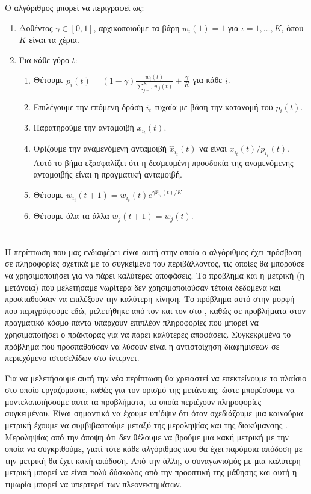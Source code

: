 Ο αλγόριθμος μπορεί να περιγραφεί ως:
\begin{enumerate}
    \item Δοθέντος $γ \in [0,1]$, αρχικοποιούμε τα βάρη $w_i(1)=1$ για $ι = 1,\ldots,K$, όπου $K$ είναι τα χέρια.
    \item Για κάθε γύρο $t$:
          \begin{enumerate}
              \item Θέτουμε $p_i(t) = (1-γ)\frac{w_i(t)}{\sum_{j=1}^K w_j(t)} + \frac{γ}{K}$ για κάθε $i$.
              \item Επιλέγουμε την επόμενη δράση $i_t$ τυχαία με βάση την κατανομή του $p_i(t)$.
              \item Παρατηρούμε την ανταμοιβή $x_{i_t}(t)$.
              \item Ορίζουμε την αναμενόμενη ανταμοιβή $\hat{x}_{i_t}(t)$ να είναι $x_{i_t}(t)/p_{i_t}(t)$. Αυτό το βήμα εξασφαλίζει ότι η δεσμευμένη προσδοκία της αναμενόμενης ανταμοιβής είναι η πραγματική ανταμοιβή.
              \item Θέτουμε $w_{i_t}(t+1) = w_{i_t}(t)e^{γ\hat{x}_{i_t}(t)/K}$
              \item Θέτουμε όλα τα άλλα $w_j(t+1) = w_j(t)$.
          \end{enumerate}
\end{enumerate}

\section{}
Η περίπτωση  που μας ενδιαφέρει είναι αυτή στην οποία ο αλγόριθμος έχει πρόσβαση σε πληροφορίες σχετικά με το συγκείμενο του περιβάλλοντος, τις οποίες θα μπορούσε να χρησιμοποιήσει για να πάρει καλύτερες αποφάσεις. Το πρόβλημα και η μετρική (η μετάνοια) που μελετήσαμε νωρίτερα δεν χρησιμοποιούσαν τέτοια δεδομένα και προσπαθούσαν να επιλέξουν την καλύτερη κίνηση. Το πρόβλημα αυτό στην μορφή που περιγράφουμε εδώ, μελετήθηκε από τον   και τον  στο \cite{langford_epoch-greedy_2007}, καθώς σε προβλήματα στον πραγματικό κόσμο πάντα υπάρχουν επιπλέον πληροφορίες που μπορεί να χρησιμοποιήσει ο πράκτορας για να πάρει καλύτερες αποφάσεις. Συγκεκριμένα το πρόβλημα που προσπαθούσαν να λύσουν είναι η αντιστοίχηση διαφημισεων σε περιεχόμενο ιστοσελίδων στο ίντερνετ.

Για να μελετήσουμε αυτή την νέα περίπτωση θα χρειαστεί να επεκτείνουμε το πλαίσιο στο οποίο εργαζόμαστε, καθώς για τον ορισμό της μετάνοιας, ώστε μπορέσουμε να μοντελοποιήσουμε αυτα τα προβλήματα, τα οποία περιέχουν πληροφορίες συγκειμένου. Είναι σημαντικό να έχουμε υπ'όψιν ότι όταν σχεδιάζουμε μια καινούρια μετρική έχουμε να  συμβιβαστούμε μεταξύ της μεροληψίας και της διακύμανσης . Μεροληψίας από την άποψη ότι δεν θέλουμε να βρούμε μια κακή μετρική με την οποία να συγκριθούμε, γιατί τότε κάθε αλγόριθμος που θα έχει παρόμοια απόδοση με την μετρική θα έχει κακή απόδοση. Από την άλλη, ο συναγωνισμός με μια καλύτερη μετρική μπορεί να είναι πολύ δύσκολος από την προοπτική της μάθησης και αυτή η τιμωρία μπορεί να υπερτερεί των πλεονεκτημάτων.


